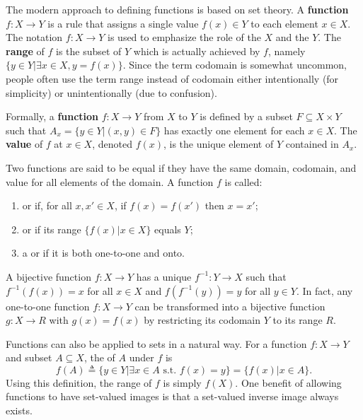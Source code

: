 The modern approach to defining functions is based on set theory.
A \textbf{function} $f \colon X\rightarrow Y$ is a rule that assigns a single value $f(x)\in Y$ to each element $x\in X$.
The notation $f \colon X \rightarrow Y$ is used to emphasize the role of the  $X$ and the  $Y$.
The \textbf{range} of $f$ is the subset of $Y$ which is actually achieved by $f$, namely $\{y \in Y | \exists x\in X, y=f(x) \}$.
Since the term codomain is somewhat uncommon, people often use the term range instead of codomain either intentionally (for simplicity) or unintentionally (due to confusion).

\begin{definition}
Formally, a \textbf{function} $f \colon X \rightarrow Y$ from $X$ to $Y$ is defined by a subset $F \subseteq X \times Y$ such that $A_x = \{ y\in Y | (x,y)\in F \}$ has exactly one element for each $x\in X$.
The \textbf{value} of $f$ at $x\in X$, denoted $f(x)$, is the unique element of $Y$ contained in $A_x$.
\end{definition}

Two functions are said to be equal if they have the same domain, codomain, and value for all elements of the domain.
A function $f$ is called:
\begin{enumerate}
\item {} or  if, for all $x,x'\in X$, if $f(x)=f(x')$ then $x=x'$;
\item {} or  if its range $\{ f(x) | x\in X\}$ equals $Y$;
\item a  or  if it is both one-to-one and onto.
\end{enumerate}
A bijective function $f \colon X\rightarrow Y$ has a unique  $f^{-1} \colon Y\rightarrow X$ such that $f^{-1}(f(x)) = x$ for all $x\in X$ and $f(f^{-1}(y)) = y$ for all $y\in Y$.
In fact, any one-to-one function $f \colon X\rightarrow Y$ can be transformed into a bijective function $g \colon X \rightarrow R$ with $g(x)=f(x)$ by restricting its codomain $Y$ to its range $R$.

Functions can also be applied to sets in a natural way.
For a function $f \colon X\rightarrow Y$ and subset $A\subseteq X$, the  of $A$ under $f$ is
\[ f(A) \triangleq \{ y\in Y | \exists x\in A \textrm{ s.t. } f(x)=y\} = \{f(x) | x\in A\}. \]
Using this definition, the range of $f$ is simply $f(X)$.
One benefit of allowing functions to have set-valued images is that a set-valued inverse image always exists.

